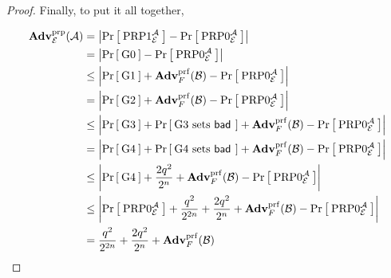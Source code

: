 \begin{proof}
Finally, to put it all together,

\begin{align*}
\AdvPRP{\Feistel}{\advA}
    &=\left|\Prob{\PRP1^\advA_\Feistel} - \Prob{\PRP0^\advA_\Feistel}\right|\\
    &= \left|\Prob{\G0} - \Prob{\PRP0^\advA_\cipher}\right|\\
    &\le \left|\Prob{\G1} + \AdvPRF{F}{\advB} - \Prob{\PRP0^\advA_\cipher}\right|\\
    &=   \left|\Prob{\G2} + \AdvPRF{F}{\advB} - \Prob{\PRP0^\advA_\cipher}\right|\\
    &\le \left|\Prob{\G3} + \Prob{\G3\setsbad} + \AdvPRF{F}{\advB} - \Prob{\PRP0^\advA_\cipher}\right|\\
    &= \left|\Prob{\G4} + \Prob{\G4\setsbad} + \AdvPRF{F}{\advB} - \Prob{\PRP0^\advA_\cipher}\right|\\
    &\le \left|\Prob{\G4} + \frac{2q^2}{2^n} + \AdvPRF{F}{\advB} - \Prob{\PRP0^\advA_\cipher}\right|\\
    &\le \left|\Prob{\PRP0^\advA_\cipher} + \frac{q^2}{2^{2n}} + \frac{2q^2}{2^n} + \AdvPRF{F}{\advB} - \Prob{\PRP0^\advA_\cipher}\right|\\
    &= \frac{q^2}{2^{2n}} + \frac{2q^2}{2^n} + \AdvPRF{F}{\advB}\\
\end{align*}

\end{proof}
